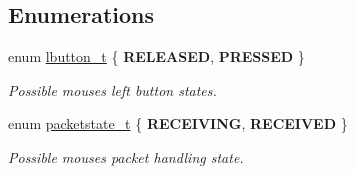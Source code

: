 \subsection*{Enumerations}
\begin{DoxyCompactItemize}
\item 
\hypertarget{group__mouse_ga3a546a0495d63ebc047bb726b47a4425}{}\label{group__mouse_ga3a546a0495d63ebc047bb726b47a4425} 
enum \hyperlink{group__mouse_ga3a546a0495d63ebc047bb726b47a4425}{lbutton\+\_\+t} \{ {\bfseries R\+E\+L\+E\+A\+S\+ED}, 
{\bfseries P\+R\+E\+S\+S\+ED}
 \}\begin{DoxyCompactList}\small\item\em Possible mouse\textquotesingle{}s left button states. \end{DoxyCompactList}
\item 
\hypertarget{group__mouse_ga5fe920806b75c05466affe22b6156a21}{}\label{group__mouse_ga5fe920806b75c05466affe22b6156a21} 
enum \hyperlink{group__mouse_ga5fe920806b75c05466affe22b6156a21}{packetstate\+\_\+t} \{ {\bfseries R\+E\+C\+E\+I\+V\+I\+NG}, 
{\bfseries R\+E\+C\+E\+I\+V\+ED}
 \}\begin{DoxyCompactList}\small\item\em Possible mouse\textquotesingle{}s packet handling state. \end{DoxyCompactList}
\end{DoxyCompactItemize}
